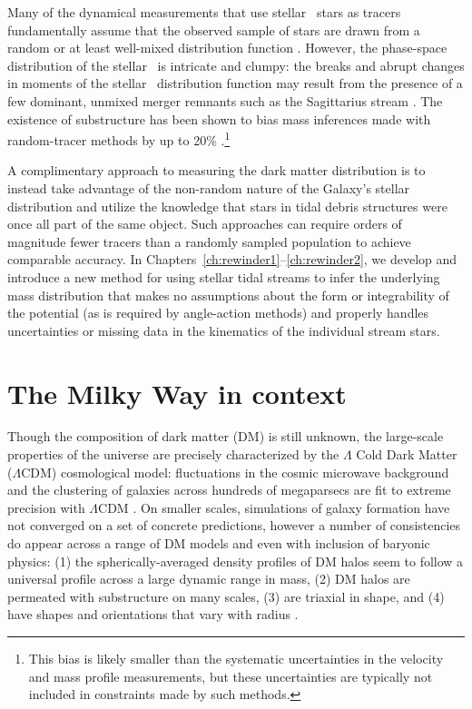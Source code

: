 Many of the dynamical measurements that use stellar \mwhalo\ stars as tracers
fundamentally assume that the observed sample of stars are drawn from a random
or at least well-mixed distribution function \citep[e.g.,][]{battaglia05,
kafle12, kafle14}. However, the phase-space distribution of the stellar \mwhalo\
is intricate and clumpy: the breaks and abrupt changes in moments of the stellar
\mwhalo\ distribution function may result from the presence of a few dominant,
unmixed merger remnants such as the Sagittarius stream \citep[which contains
almost as much stellar mass as the rest of the stellar \mwhalo\
combined;][]{niedersteostholt10}. The existence of substructure has been shown
to bias mass inferences made with random-tracer methods by up to 20\%
\citep{yencho06}.\footnote{This bias is likely smaller than the systematic
uncertainties in the velocity and mass profile measurements, but these
uncertainties are typically not included in constraints made by such methods.}

A complimentary approach to measuring the dark matter distribution is to instead
take advantage of the non-random nature of the Galaxy's stellar distribution and
utilize the knowledge that stars in tidal debris structures were once all part
of the same object. Such approaches can require orders of magnitude fewer
tracers than a randomly sampled population to achieve comparable accuracy. In
\todo{why is this broken} Chapters~\ref{ch:rewinder1}--\ref{ch:rewinder2}, we
develop and introduce a new method for using stellar tidal streams to infer the
underlying mass distribution that makes no assumptions about the form or
integrability of the potential (as is required by angle-action methods) and
properly handles uncertainties or missing data in the kinematics of the
individual stream stars.

\section{The Milky Way in context} \label{sec:mw-context}

Though the composition of dark matter (DM) is still unknown, the large-scale
properties of the universe are precisely characterized by the $\Lambda$ Cold
Dark Matter ($\Lambda$CDM) cosmological model: fluctuations in the cosmic
microwave background and the clustering of galaxies across hundreds of
megaparsecs are fit to extreme precision with $\Lambda$CDM \citep{planck15,
sanchez12}. On smaller scales, simulations of galaxy formation have not
converged on a set of concrete predictions, however a number of consistencies do
appear across a range of DM models and even with inclusion of baryonic physics:
(1) the spherically-averaged density profiles of DM halos seem to follow a
universal profile across a large dynamic range in mass, (2) DM halos are
permeated with substructure on many scales, (3) are triaxial in shape, and (4)
have shapes and orientations that vary with radius \citep{dubinski91, navarro96,
jing02, kuhlen07, veraciro11}.


